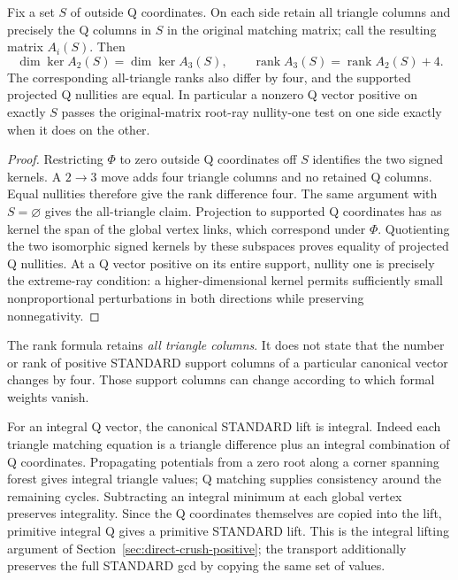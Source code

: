 \begin{corollary}
\label{cor:q-zero-pachner-rank}
Fix a set $S$ of outside Q coordinates.  On each side retain all triangle
columns and precisely the Q columns in $S$ in the original matching
matrix; call the resulting matrix $A_i(S)$.  Then
\[
 \dim\ker A_2(S)=\dim\ker A_3(S),\qquad
 \operatorname{rank}A_3(S)=\operatorname{rank}A_2(S)+4.
\]
The corresponding all-triangle ranks also differ by four, and the
supported projected Q nullities are equal.  In particular a nonzero Q
vector positive on exactly $S$ passes the original-matrix root-ray
nullity-one test on one side exactly when it does on the other.
\end{corollary}
\begin{proof}
Restricting $\Phi$ to zero outside Q coordinates off $S$ identifies the
two signed kernels.  A $2\to3$ move adds four triangle columns and no
retained Q columns.  Equal nullities therefore give the rank difference
four.  The same argument with $S=\varnothing$ gives the all-triangle
claim.  Projection to supported Q coordinates has as kernel the span
of the global vertex links, which correspond under $\Phi$.  Quotienting
the two isomorphic signed kernels by these subspaces proves equality
of projected Q nullities.  At a Q vector positive on its entire support,
nullity one is precisely the extreme-ray condition: a higher-dimensional
kernel permits sufficiently small nonproportional perturbations in both
directions while preserving nonnegativity.
\end{proof}

The rank formula retains \emph{all triangle columns}.  It does not state
that the number or rank of positive STANDARD support columns of a
particular canonical vector changes by four.  Those support columns can
change according to which formal weights vanish.

For an integral Q vector, the canonical STANDARD lift is integral.
Indeed each triangle matching equation is a triangle difference plus an
integral combination of Q coordinates.  Propagating potentials from a
zero root along a corner spanning forest gives integral triangle values;
Q matching supplies consistency around the remaining cycles.  Subtracting
an integral minimum at each global vertex preserves integrality.  Since
the Q coordinates themselves are copied into the lift, primitive integral
Q gives a primitive STANDARD lift.  This is the integral lifting argument
of Section~\ref{sec:direct-crush-positive}; the transport additionally
preserves the full STANDARD gcd by copying the same set of values.

